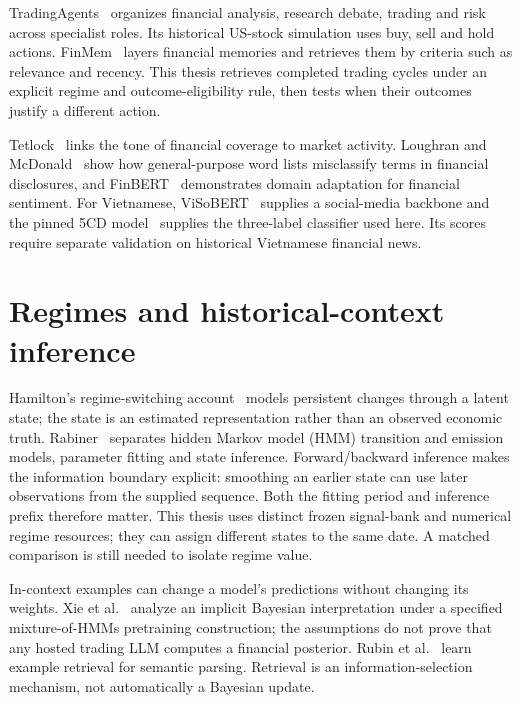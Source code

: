 TradingAgents~\cite{tradingagents2024} organizes financial analysis,
research debate, trading and risk across specialist roles. Its
historical US-stock simulation uses buy, sell and hold actions.
FinMem~\cite{yu2025finmem} layers financial memories and retrieves
them by criteria such as relevance and recency. This thesis retrieves
completed trading cycles under an explicit regime and outcome-eligibility
rule, then tests when their outcomes justify a different action.

Tetlock~\cite{tetlock2007news} links the tone of financial coverage to
market activity. Loughran and McDonald~\cite{loughran2011liability}
show how general-purpose word lists misclassify terms in financial
disclosures, and FinBERT~\cite{araci2019finbert} demonstrates domain
adaptation for financial sentiment. For Vietnamese, ViSoBERT~\cite{nguyen2023visobert}
supplies a social-media backbone and the pinned 5CD model~\cite{hf5cdsentiment}
supplies the three-label classifier used here. Its scores require
separate validation on historical Vietnamese financial news.

\section{Regimes and historical-context inference}\label{s:72ac96e2a9d3b286}
Hamilton's regime-switching account~\cite{hamilton1989regimes} models persistent changes through a
latent state; the state is an estimated representation rather than an
observed economic truth. Rabiner~\cite{rabiner1989hmm} separates hidden Markov model (HMM) transition and emission models, parameter fitting and state inference.
Forward/backward inference makes the information boundary explicit:
smoothing an earlier state can use later observations from the supplied
sequence. Both the fitting period and inference prefix therefore matter.
This thesis uses distinct frozen signal-bank and
numerical regime resources; they can assign different states to the same
date. A matched comparison is still needed to isolate regime value.

In-context examples can change a model's predictions without changing its
weights. Xie et al.~\cite{xie2022implicitbayes} analyze an implicit Bayesian interpretation under a
specified mixture-of-HMMs pretraining construction; the assumptions do
not prove that any hosted trading LLM computes a financial posterior.
Rubin et al.~\cite{rubin2022retrieve} learn example retrieval for
semantic parsing. Retrieval is an information-selection mechanism, not
automatically a Bayesian update.

